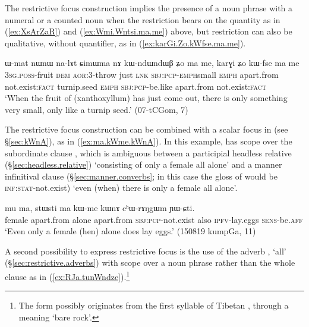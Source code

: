 The restrictive focus construction implies the presence of a noun phrase with a numeral or a counted noun when the restriction bears on the quantity as in (\ref{ex:XsArZaR}) and (\ref{ex:Wmi.Wntsi.ma.me}) above, but restriction can also be qualitative, without quantifier, as in (\ref{ex:karGi.Zo.kWfse.ma.me}).

\begin{exe}
\ex \label{ex:karGi.Zo.kWfse.ma.me}
 \gll   ɯ-mat nɯnɯ na-lɤt ɕimɯma nɤ kɯ-ndɯ\redp{}ndɯβ ʑo ma me, karɣi ʑo kɯ-fse ma me  \\
 \textsc{3sg}.\textsc{poss}-fruit \textsc{dem} \textsc{aor}:3\flobv{}-throw just \textsc{lnk}  \textsc{sbj}:\textsc{pcp}-\textsc{emph}\redp{}small \textsc{emph} apart.from not.exist:\textsc{fact} turnip.seed \textsc{emph} \textsc{sbj}:\textsc{pcp}-be.like apart.from not.exist:\textsc{fact} \\
 \glt  `When the fruit of (xanthoxyllum) has just come out, there is only something very small, only like a turnip seed.'  (07-tCGom, 7)
  \end{exe}
  
The restrictive focus construction can be combined with a scalar focus in  (see §\ref{sec:kWnA}), as in (\ref{ex:ma.kWme.kWnA}). In this example,  has scope over the subordinate clause , which is ambiguous between a participial headless relative (§\ref{sec:headless.relative}) `consisting of only a female all alone' and a manner infinitival clause (§\ref{sec:manner.converbs}; in this case the gloss of  would be \textsc{inf}:\textsc{stat}-not.exist) `even (when) there is only a female all alone'.

  \begin{exe}
\ex \label{ex:ma.kWme.kWnA}
\gll  mu ma, stɯsti ma kɯ-me kɯnɤ cʰɯ-rɤŋgɯm ɲɯ-ɕti. \\
female apart.from alone apart.from \textsc{sbj}:\textsc{pcp}-not.exist also \textsc{ipfv}-lay.eggs \textsc{sens}-be.\textsc{aff} \\
\glt `Even only a female (hen) alone does lay eggs.' (150819 kumpGa, 11)
\end{exe}
   
A second possibility to express restrictive focus is the use of the adverb , `all' (§\ref{sec:restrictive.adverbs}) with scope over a noun phrase rather than the whole clause as in (\ref{ex:RJa.tunWndze}).\footnote{The form  possibly originates from the first syllable of Tibetan , through a meaning `bare rock'.}  

